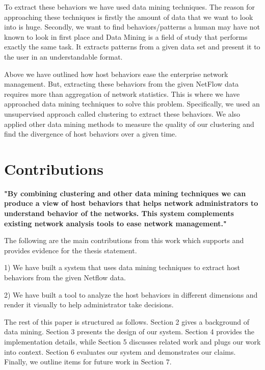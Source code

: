 To extract these behaviors we have used data mining techniques. The reason for approaching these techniques is firstly the amount of data that we want to look into is huge. Secondly, we want to find behaviors/patterns a human may have not known to look in first place and Data Mining is a field of study that performs exactly the same task. It extracts patterns from a given data set and present it to the user in an understandable format.

Above we have outlined how host behaviors ease the enterprise network management. But, extracting these behaviors from the given NetFlow data requires more than aggregation of network statistics. This is where we have approached data mining techniques to solve this problem. Specifically, we used an unsupervised approach called clustering to extract these behaviors. We also applied other data mining methods to measure the quality of our clustering and find the divergence of host behaviors over a given time.  


\section{Contributions}
\textbf{"By combining clustering and other data mining techniques we can produce a view of host behaviors that helps network administrators to understand behavior of the networks. This system complements existing network analysis tools to ease network management."}

The following are the main contributions from this work which supports and provides evidence for the thesis statement.

1) We have built a system that uses data mining techniques to extract host behaviors from the given Netflow data.

2) We have built a tool to analyze the host behaviors in different dimensions and render it visually to help administrator take decisions.

The rest of this paper is structured as follows. Section 2 gives a background of data mining. Section 3 presents the design of our system. Section 4 provides the implementation details, while Section 5 discusses related work and plugs our work into context. Section 6 evaluates our system  and demonstrates our claims. Finally, we outline items for future work in Section 7.
